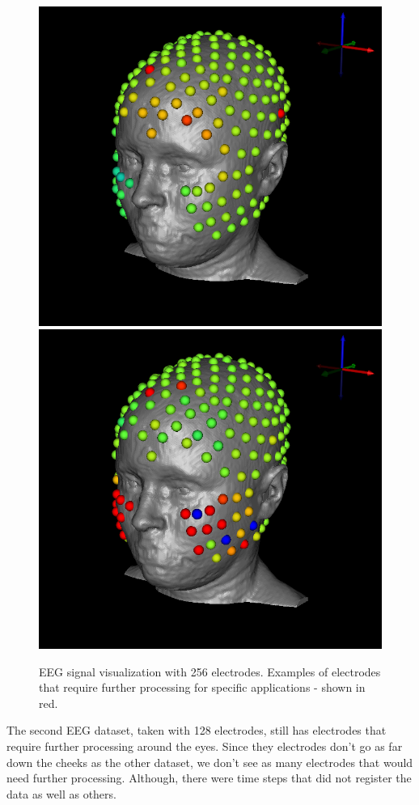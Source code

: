 \begin{figure}[H]
\begin{center}
\includegraphics[width=.49\textwidth]{Figures/eeg_1}
\includegraphics[width=.49\textwidth]{Figures/eeg_2}
\caption{EEG signal visualization with 256 electrodes. Examples of electrodes that require further processing for specific applications - shown in red.}
\label{fig:eegvis}
\end{center}
\end{figure}
The second EEG dataset, taken with 128 electrodes, still has electrodes that require further processing around the eyes. Since they electrodes don't go as far down the cheeks as the other dataset, we don't see as many electrodes that would need further processing. Although, there were time steps that did not register the data as well as others. 

